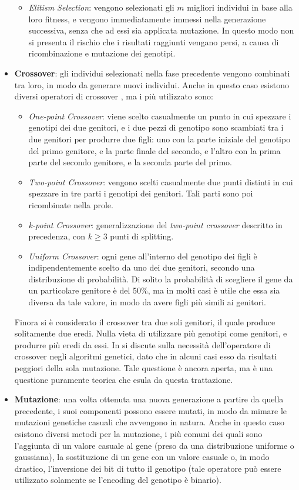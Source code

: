 \documentclass[a4paper,12pt]{article}
\begin{document}
\begin{itemize}
\begin{itemize}
		\item \emph{Elitism Selection}: vengono selezionati gli $m$ migliori individui in base alla loro fitness, e vengono immediatamente immessi nella generazione successiva, senza che ad essi sia applicata mutazione. In questo modo non si presenta il rischio che i risultati raggiunti vengano persi, a causa di ricombinazione e mutazione dei genotipi. 
	\end{itemize}
	\item \textbf{Crossover}: gli individui selezionati nella fase precedente vengono combinati tra loro, in modo da generare nuovi individui. Anche in questo caso esistono diversi operatori di crossover \cite{GAsurvey}, ma i più utilizzato sono: 
	\begin{itemize}
		\item \emph{One-point Crossover}: viene scelto casualmente un punto in cui spezzare i genotipi dei due genitori, e i due pezzi di genotipo sono scambiati tra i due genitori per produrre due figli: uno con la parte iniziale del genotipo del primo genitore, e la parte finale del secondo, e l'altro con la prima parte del secondo genitore, e la seconda parte del primo. 
		\item \emph{Two-point Crossover}: vengono scelti casualmente due punti distinti in cui spezzare in tre parti i genotipi dei genitori. Tali parti sono poi ricombinate nella prole. 
		\item \emph{k-point Crossover}: generalizzazione del \emph{two-point crossover} descritto in precedenza, con $k \ge 3$ punti di splitting.
		\item \emph{Uniform Crossover}: ogni gene all'interno del genotipo dei figli è indipendentemente scelto da uno dei due genitori, secondo una distribuzione di probabilità. Di solito la probabilità di scegliere il gene da un particolare genitore è del 50\%, ma in molti casi è utile che essa sia diversa da tale valore, in modo da avere figli più simili ai genitori.  
	\end{itemize}
	Finora si è considerato il crossover tra due soli genitori, il quale produce solitamente due eredi. Nulla vieta di utilizzare più genotipi come genitori, e produrre più eredi da essi. In \cite{GAsurvey} si discute sulla necessità dell'operatore di crossover negli algoritmi genetici, dato che in alcuni casi esso da risultati peggiori della sola mutazione. Tale questione è ancora aperta, ma è una questione puramente teorica che esula da questa trattazione.
	\item \textbf{Mutazione}: una volta ottenuta una nuova generazione a partire da quella precedente, i suoi componenti possono essere mutati, in modo da mimare le mutazioni genetiche casuali che avvengono in natura. Anche in questo caso esistono diversi metodi per la mutazione, i più comuni dei quali sono l'aggiunta di un valore casuale al gene (preso da una distribuzione uniforme o gaussiana), la sostituzione di un gene con un valore casuale o, in modo drastico, l'inversione dei bit di tutto il genotipo (tale operatore può essere utilizzato solamente se l'encoding del genotipo è binario).
\end{itemize}
\end{document}
